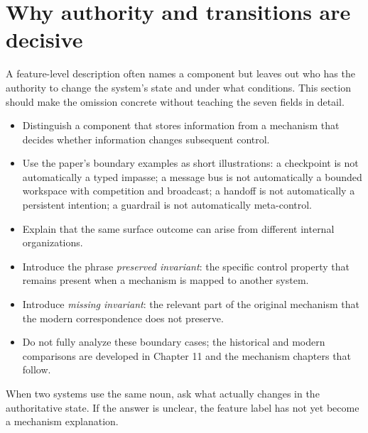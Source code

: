 \section{Why authority and transitions are decisive}
A feature-level description often names a component but leaves out who has the authority to change the system's state and under what conditions. This section should make the omission concrete without teaching the seven fields in detail.
\begin{itemize}
  \item Distinguish a component that stores information from a mechanism that decides whether information changes subsequent control.
  \item Use the paper's boundary examples as short illustrations: a checkpoint is not automatically a typed impasse; a message bus is not automatically a bounded workspace with competition and broadcast; a handoff is not automatically a persistent intention; a guardrail is not automatically meta-control.
  \item Explain that the same surface outcome can arise from different internal organizations.
  \item Introduce the phrase \emph{preserved invariant}: the specific control property that remains present when a mechanism is mapped to another system.
  \item Introduce \emph{missing invariant}: the relevant part of the original mechanism that the modern correspondence does not preserve.
  \item Do not fully analyze these boundary cases; the historical and modern comparisons are developed in Chapter 11 and the mechanism chapters that follow.
\end{itemize}
\begin{tipbox}
When two systems use the same noun, ask what actually changes in the authoritative state. If the answer is unclear, the feature label has not yet become a mechanism explanation.
\end{tipbox}

